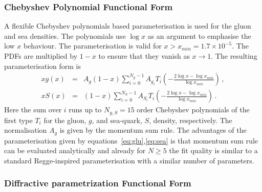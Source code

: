 \subsubsection{Chebyshev Polynomial Functional Form}
\label{sec:cheb}
A flexible Chebyshev polynomials based parameterisation is used for the gluon and sea densities. The polynomials
use $\log x$ as an argument to emphasise the low $x$ behaviour. 
The parameterisation is valid for $x>x_{min} = 1.7\times 10^{-5}$. The PDFs are multiplied
by $1-x$ to ensure that they vanish as $x\to 1$. The resulting parameterisation form is 
\begin{eqnarray}
x g(x) &=& A_g \left(1-x\right) \sum_{i=0}^{N_g-1} A_{g_i} T_i \left(-\frac{\textstyle 2\log x - \log x_{min} } {\textstyle \log x_{min} } \right)\,, \label{eq:glu} \\
x S(x) &=& \left(1-x\right) \sum_{i=0}^{N_S-1} A_{S_i} T_i \left(-\frac{\textstyle 2\log x - \log x_{min} } {\textstyle \log x_{min} } \right)\,. \label{eq:sea} 
\end{eqnarray}
Here the sum over $i$ runs up to $N_{g,S}=15$ order Chebyshev polynomials of the first type $T_i$ for
the gluon, $g$, and sea-quark, $S$, density, respectively. 
The normalisation $A_g$ is given by the momentum sum rule.
The advantages of the parameterisation given by equations~\ref{eq:glu},\ref{eq:sea} is that momentum
sum rule can be evaluated analytically and  already for $N \ge 5$ the fit quality
is similar to a standard Regge-inspired parameterisation with a similar number of parameters.

\subsubsection {Diffractive parametrization Functional Form}

